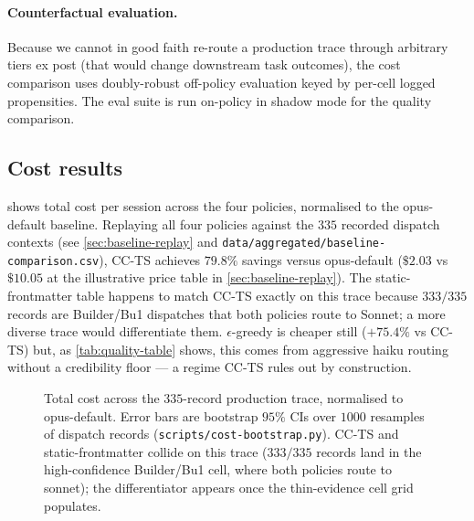 \paragraph{Counterfactual evaluation.}
Because we cannot in good faith re-route a production trace through
arbitrary tiers ex post (that would change downstream task outcomes), the
cost comparison uses doubly-robust off-policy evaluation
\cite{dudik2014doubly} keyed by per-cell logged propensities. The eval
suite is run on-policy in shadow mode for the quality comparison.

\subsection{Cost results}

 shows total cost per session across the four
policies, normalised to the opus-default baseline. Replaying all four
policies against the $335$ recorded dispatch contexts (see
\cref{sec:baseline-replay} and \texttt{data/aggregated/baseline-comparison.csv}),
CC-TS achieves $79.8\%$ savings versus opus-default ($\$2.03$ vs $\$10.05$
at the illustrative price table in \cref{sec:baseline-replay}).
The static-frontmatter table happens to match CC-TS exactly on this
trace because $333/335$ records are Builder/Bu1 dispatches that both
policies route to Sonnet; a more diverse trace would differentiate them.
$\epsilon$-greedy is cheaper still ($+75.4\%$ vs CC-TS) but, as
\cref{tab:quality-table} shows, this comes from aggressive haiku
routing without a credibility floor --- a regime CC-TS rules out by
construction.

\begin{figure}[ht]
\centering

\caption{Total cost across the $335$-record production trace,
normalised to opus-default. Error bars are bootstrap $95\%$ CIs over
$1000$ resamples of dispatch records
(\texttt{scripts/cost-bootstrap.py}). CC-TS and static-frontmatter
collide on this trace ($333/335$ records land in the high-confidence
Builder/Bu1 cell, where both policies route to sonnet); the
differentiator appears once the thin-evidence cell grid populates.}
\label{fig:cost-comparison}
\end{figure}

